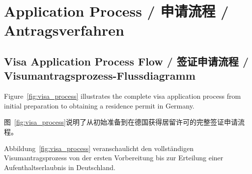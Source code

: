 \section{Application Process / 申请流程 / Antragsverfahren}

\subsection{Visa Application Process Flow / 签证申请流程 / Visumantragsprozess-Flussdiagramm}

Figure~\ref{fig:visa_process} illustrates the complete visa application process from initial preparation to obtaining a residence permit in Germany.

图~\ref{fig:visa_process}说明了从初始准备到在德国获得居留许可的完整签证申请流程。

Abbildung~\ref{fig:visa_process} veranschaulicht den vollständigen Visumantragsprozess von der ersten Vorbereitung bis zur Erteilung einer Aufenthaltserlaubnis in Deutschland.

